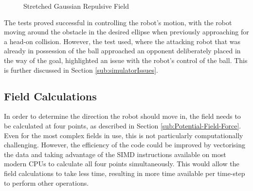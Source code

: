 \documentclass[10pt]{article}
\begin{document}
\begin{figure}
 \centering
 \caption{Stretched Gaussian Repulsive Field}
 \label{fig:stretchedGaussianField}
\end{figure}

The tests proved successful in controlling the robot's motion, with the robot
moving around the obstacle in the desired ellipse when previously approaching
for a head-on collision.  However, the test used, where the attacking robot that
was already in possession of the ball approached an opponent deliberately placed
in the way of the goal, highlighted an issue with the robot's control of the
ball.  This is further discussed in Section \ref{sub:simulatorIssues}.

\subsection{Field Calculations}

In order to determine the direction the robot should move in, the field needs to
be calculated at four points, as described in Section
\ref{sub:Potential-Field-Force}. Even for the most complex fields in use, this
is not particularly computationally challenging. However, the efficiency of the
code could be improved by vectorising the data and taking advantage of the
SIMD instructions available on most modern CPUs to calculate all four
points simultaneously. This would allow the field calculations to take less
time, resulting in more time available per time-step to perform other
operations.
\end{document}
